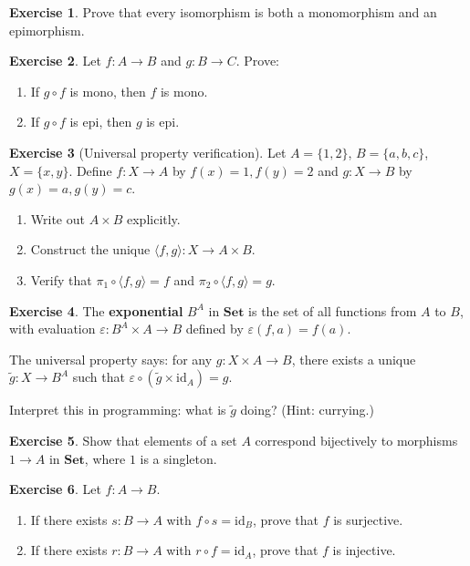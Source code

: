 \documentclass[11pt]{article}
\newcommand{\cat}[1]{\mathbf{#1}}
\newcommand{\Set}{\cat{Set}}
\newcommand{\id}{\mathrm{id}}
\theoremstyle{definition}
\newtheorem{exercise}{Exercise}[section]
\theoremstyle{plain}
\theoremstyle{remark}
\begin{document}
\begin{exercise}
Prove that every isomorphism is both a monomorphism and an epimorphism.
\end{exercise}

\begin{exercise}
Let $f: A \to B$ and $g: B \to C$. Prove:
\begin{enumerate}[label=(\alph*)]
  \item If $g \circ f$ is mono, then $f$ is mono.
  \item If $g \circ f$ is epi, then $g$ is epi.
\end{enumerate}
\end{exercise}

\begin{exercise}[Universal property verification]
Let $A = \{1, 2\}$, $B = \{a, b, c\}$, $X = \{x, y\}$. Define $f: X \to A$ by $f(x) = 1, f(y) = 2$ and $g: X \to B$ by $g(x) = a, g(y) = c$.
\begin{enumerate}[label=(\alph*)]
  \item Write out $A \times B$ explicitly.
  \item Construct the unique $\langle f, g \rangle: X \to A \times B$.
  \item Verify that $\pi_1 \circ \langle f, g \rangle = f$ and $\pi_2 \circ \langle f, g \rangle = g$.
\end{enumerate}
\end{exercise}

\begin{exercise}
The \textbf{exponential} $B^A$ in $\Set$ is the set of all functions from $A$ to $B$, with evaluation $\varepsilon: B^A \times A \to B$ defined by $\varepsilon(f, a) = f(a)$.

The universal property says: for any $g: X \times A \to B$, there exists a unique $\tilde{g}: X \to B^A$ such that $\varepsilon \circ (\tilde{g} \times \id_A) = g$.

Interpret this in programming: what is $\tilde{g}$ doing? (Hint: currying.)
\end{exercise}

\begin{exercise}
Show that elements of a set $A$ correspond bijectively to morphisms $1 \to A$ in $\Set$, where $1$ is a singleton.
\end{exercise}

\begin{exercise}
Let $f: A \to B$.
\begin{enumerate}[label=(\alph*)]
  \item If there exists $s: B \to A$ with $f \circ s = \id_B$, prove that $f$ is surjective.
  \item If there exists $r: B \to A$ with $r \circ f = \id_A$, prove that $f$ is injective.
\end{enumerate}
\end{exercise}
\end{document}
